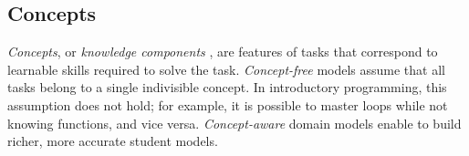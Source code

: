 %
%


\subsection{Concepts}

\emph{Concepts}, or \emph{knowledge components} \cite{knowledge-components},
are features of tasks that correspond to learnable skills %
required to solve the task.
\emph{Concept-free} models assume that all
tasks belong to a single indivisible concept.
In introductory programming, this assumption does not hold;
for example, it is possible to master loops while not knowing functions,
and vice versa.
\emph{Concept-aware} domain models
enable to build richer, more accurate student models.

